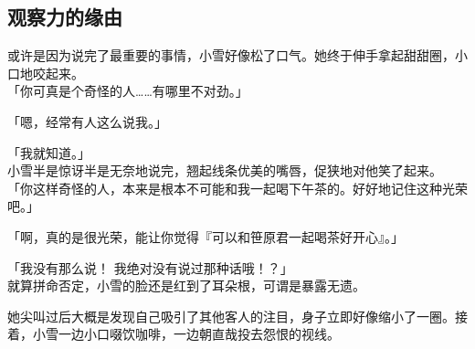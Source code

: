 \subsection{观察力的缘由}

或许是因为说完了最重要的事情，小雪好像松了口气。她终于伸手拿起甜甜圈，小口地咬起来。\\

「你可真是个奇怪的人……有哪里不对劲。」

「嗯，经常有人这么说我。」

「我就知道。」\\

小雪半是惊讶半是无奈地说完，翘起线条优美的嘴唇，促狭地对他笑了起来。\\

「你这样奇怪的人，本来是根本不可能和我一起喝下午茶的。好好地记住这种光荣吧。」

「啊，真的是很光荣，能让你觉得『可以和笹原君一起喝茶好开心』。」

「我没有那么说！ 我绝对没有说过那种话哦！？」\\

就算拼命否定，小雪的脸还是红到了耳朵根，可谓是暴露无遗。

她尖叫过后大概是发现自己吸引了其他客人的注目，身子立即好像缩小了一圈。接着，小雪一边小口啜饮咖啡，一边朝直哉投去怨恨的视线。\\

